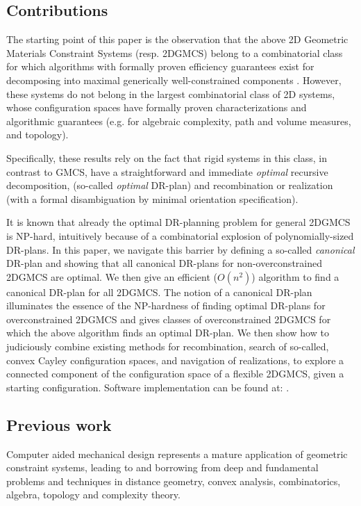 \subsection{Contributions}

The starting point of this paper is the observation that the above 2D Geometric Materials Constraint Systems (resp. 2DGMCS) 
belong to a combinatorial class for which algorithms with formally proven efficiency guarantees exist for  
decomposing into maximal generically well-constrained components . However, these systems do not 
belong in the largest combinatorial class of 2D systems, whose configuration spaces have formally proven  characterizations and 
algorithmic guarantees (e.g. for algebraic complexity, path and volume measures, and  topology).

Specifically, these results  rely on the fact that rigid systems in this  class, in contrast to GMCS, 
have a straightforward and immediate {\sl optimal} recursive decomposition, (so-called {\sl optimal} DR-plan) and  recombination 
or realization (with a formal disambiguation by minimal orientation specification).

It is known  that already the optimal DR-planning problem for general 2DGMCS is NP-hard, intuitively 
because of a combinatorial explosion of polynomially-sized DR-plans.  In this paper, we  navigate this barrier by defining a 
so-called {\it canonical} DR-plan and showing that all canonical DR-plans for non-overconstrained 2DGMCS are optimal. 
We then give an efficient ($O(n^2)$) algorithm to find a canonical DR-plan for all 2DGMCS. The notion of a canonical DR-plan 
illuminates the essence of the NP-hardness of finding optimal DR-plans for overconstrained 2DGMCS and gives classes of 
overconstrained 2DGMCS for which the above  algorithm finds an optimal DR-plan. We then show how to judiciously combine 
existing methods for recombination, search of so-called, convex Cayley configuration spaces, and navigation of realizations, 
to explore a connected component of the configuration space of a flexible 2DGMCS, given a starting configuration. 
Software implementation can be found at: .


\subsection{Previous work}

Computer aided mechanical design represents a mature application of geometric constraint systems,  leading to and borrowing 
from deep and fundamental problems and techniques in distance geometry, convex analysis, combinatorics, algebra, topology 
and complexity theory.

